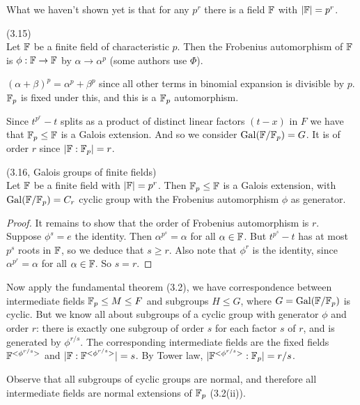 \documentclass[a4paper]{article}
\begin{document}
What we haven't shown yet is that for any $p^r$ there is a field $\mathbb{F}$ with $|\mathbb{F}| = p^r$.

\begin{defi} (3.15)\\
Let $\mathbb{F}$ be a finite field of characteristic $p$. Then the Frobenius automorphism of $\mathbb{F}$ is $\phi:\mathbb{F} \to \mathbb{F}$ by $\alpha \to \alpha^p$ (some authors use $\Phi$).
\end{defi}

\begin{rem}
$(\alpha+\beta)^p = \alpha^p + \beta^p$ since all other terms in binomial expansion is divisible by $p$. $\mathbb{F}_p$ is fixed under this, and this is a $\mathbb{F}_p$ automorphism.

Since $t^{p^r}-t$ splits as a product of distinct linear factors $(t-x)$ in $F$ we have that $\mathbb{F}_p \leq \mathbb{F}$ is a Galois extension. And so we consider $\operatorname{Gal}(\mathbb{F}/\mathbb{F}_p) = G$. It is of order $r$ since $|\mathbb{F}:\mathbb{F}_p| = r$.
\end{rem}

\begin{thm} (3.16, Galois groups of finite fields)\\
Let $\mathbb{F}$ be a finite field with $|\mathbb{F}| = p^r$. Then $\mathbb{F}_p \leq \mathbb{F}$ is a Galois extension, with $\operatorname{Gal}(\mathbb{F}/\mathbb{F}_p) = C_r$ cyclic group with the Frobenius automorphism $\phi$ as generator.
\begin{proof}
It remains to show that the order of Frobenius automorphism is $r$. Suppose $\phi^s = e$ the identity. Then $\alpha^{p^s} = \alpha$ for all $\alpha \in \mathbb{F}$. But $t^{p^s}-t$ has at most $p^s$ roots in $\mathbb{F}$, so we deduce that $s \geq r$. Also note that $\phi^r$ is the identity, since $\alpha^{p^r} = \alpha$ for all $\alpha \in \mathbb{F}$. So $s=r$.
\end{proof}
\end{thm}

Now apply the fundamental theorem (3.2), we have correspondence between intermediate fields $\mathbb{F}_p \leq M \leq F$ and subgroups $H \leq G$, where $G = \operatorname{Gal}(\mathbb{F}/\mathbb{F}_p)$ is cyclic. But we know all about subgroups of a cyclic group with generator $\phi$ and order $r$: there is exactly one subgroup of order $s$ for each factor $s$ of $r$, and is generated by $\phi^{r/s}$. The corresponding intermediate fields are the fixed fields $\mathbb{F}^{<\phi^{r/s}>}$ and $|\mathbb{F}:\mathbb{F}^{<\phi^{r/s}>}| = s$. By Tower law, $|\mathbb{F}^{<\phi^{r/s}>}:\mathbb{F}_p| = r/s$.

Observe that all subgroups of cyclic groups are normal, and therefore all intermediate fields are normal extensions of $\mathbb{F}_p$ (3.2(ii)).
\end{document}
